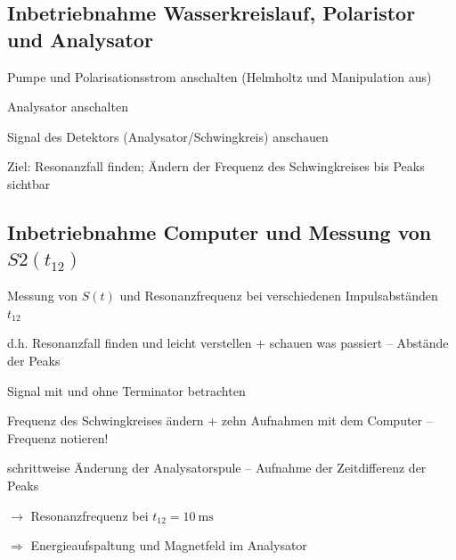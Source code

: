 \documentclass[paper=a4,
	fontsize=10pt,
	DIV=18,
	twocolumn,
	parskip=half
	]{scrartcl}
\numberwithin{equation}{section}    %
\newcommand{\tra}{$\rightarrow$}
\newcommand{\Tra}{$\Rightarrow$}
\begin{document}
\subsection{Inbetriebnahme Wasserkreislauf, Polaristor und Analysator}
\label{vorbereitung2}

\begin{compactitem}
	\item Pumpe und Polarisationsstrom anschalten (Helmholtz und Manipulation aus)
	\item Analysator anschalten
	\item Signal des Detektors (Analysator/Schwingkreis) anschauen
	\item Ziel: Resonanzfall finden; Ändern der Frequenz des Schwingkreises bis Peaks sichtbar
\end{compactitem}

\subsection{Inbetriebnahme Computer und Messung von $S2(t_{12})$}
\label{vorbereitung3}



\begin{compactitem}
	\item Messung von $S(t)$ und Resonanzfrequenz bei verschiedenen Impulsabständen $t_{12}$
	\item[d.h.] Resonanzfall finden und leicht verstellen + schauen was passiert \--- Abstände der Peaks
	\item Signal mit und ohne Terminator betrachten
	\item Frequenz des Schwingkreises ändern + zehn Aufnahmen mit dem Computer \--- Frequenz notieren!
	\item schrittweise Änderung der Analysatorspule \--- Aufnahme der Zeitdifferenz der Peaks
	\item[\tra] Resonanzfrequenz bei $t_{12} = \SI{10}{\milli\second}$
	\item[\Tra] Energieaufspaltung und Magnetfeld im Analysator
\end{compactitem}

\end{document}
